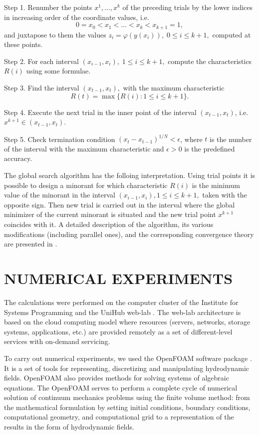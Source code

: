 \documentclass{aip-cp}
\begin{document}
Step 1. Renumber the points  $x^1,...,x^k$ of the preceding trials by the lower indices in increasing order of the coordinate values, i.e.
\begin{equation}\label{x_i}
0=x_0<x_1<\dots <x_k<x_{k+1}=1,
\end{equation}
and juxtapose to them the values $z_i=\varphi(y(x_i)), \; 0 \leq i\leq k+1,$  computed at these points.

Step 2. For each interval $(x_{i-1},x_i), \; 1\leq i \leq k+1,$ compute the characteristics $R(i)$ using some formulae.

Step 3. Find the interval $(x_{t-1},x_t),$ with the maximum characteristic \cite{Grishagin1997}
\[
R(t)=\max\{R(i):1 \leq i \leq k+1\}.
\]

Step 4. Execute the next trial in the inner point of the interval  $(x_{t-1},x_t)$, i.e. $x^{k+1} \in (x_{t-1},x_t)$.

Step 5. Check termination condition  $\left(x_t-x_{t-1}\right)^{1/N}<\epsilon$, where $t$ is the number of the interval with the maximum characteristic and $\epsilon>0$ is the predefined accuracy.

The global search algorithm has the folloing interpretation. Using trial points it is possible to design a minorant for which characteristic $R(i)$ is the minimum value of the minorant in the interval $(x_{i-1}, x_i ), 1 \leq i \leq k + 1,$ taken with the opposite sign. Then new trial is carried out in the interval where the global minimizer of the current minorant is situated and the new trial point $x^{k+1}$ coincides with it.
A detailed description of the algorithm, its various modifications (including parallel ones), and the corresponding convergence  theory are presented in \cite{Strongin2000,Barkalov2010,Strongin2020}.
	

\section{NUMERICAL EXPERIMENTS}

The calculations were performed on the computer cluster of the Institute for Systems Programming and the UniHub web-lab \cite{UniHub}. The web-lab architecture is based on the cloud computing model where resources (servers, networks, storage systems, applications, etc.) are provided remotely as a set of different-level services with on-demand servicing.

To carry out numerical experiments, we used the OpenFOAM software package \cite{OpenFOAM}. It is a set of tools for representing, discretizing and manipulating hydrodynamic fields. OpenFOAM also provides methods for solving systems of algebraic equations. The OpenFOAM serves to perform a complete cycle of numerical solution of continuum mechanics problems using the finite volume method: from the mathematical formulation by setting initial conditions, boundary conditions, computational geometry, and computational grid to a representation of the results in the form of hydrodynamic fields.
\end{document}
